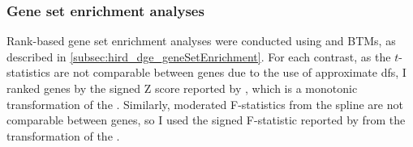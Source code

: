 

\subsubsection{Gene set enrichment analyses}

Rank-based gene set enrichment analyses were conducted using  \autocite{weiner3rd2016TmodPackageGeneral} and \glspl{BTM}, as described in \cref{subsec:hird_dge_geneSetEnrichment}.
%
For each contrast, 
as the $t$-statistics are not comparable between genes due to the use of approximate \glspl{df},
I ranked genes by the signed Z score reported by , which is a monotonic transformation of the \pvalue{}.
Similarly, moderated F-statistics from the spline are not comparable between genes, so I used the signed F-statistic reported by  from the transformation of the \pvalue{}.

